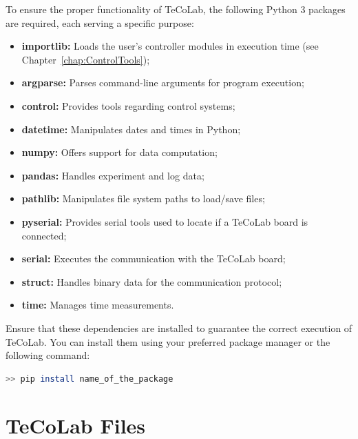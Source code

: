 \documentclass[12pt]{report}
\begin{document}
To ensure the proper functionality of TeCoLab, the following Python 3 packages are required, each serving a specific purpose:

\begin{itemize}
\item \textbf{importlib:} Loads the user's controller modules in execution time (see Chapter~\ref{chap:ControlTools});
\item \textbf{argparse:} Parses command-line arguments for program execution;

\item \textbf{control:} Provides tools regarding control systems;

\item \textbf{datetime:} Manipulates dates and times in Python;

\item \textbf{numpy:} Offers support for data computation;

\item \textbf{pandas:} Handles experiment and log data;

\item \textbf{pathlib:} Manipulates file system paths to load/save files;

\item \textbf{pyserial:} Provides serial tools used to locate if a TeCoLab board is connected;

\item \textbf{serial:} Executes the communication with the TeCoLab board;

\item \textbf{struct:} Handles binary data for the communication protocol;

\item \textbf{time:} Manages time measurements.

\end{itemize}

Ensure that these dependencies are installed to guarantee the correct execution of TeCoLab. You can install them using your preferred package manager or the following command:

\begin{lstlisting}[language=bash]
>> pip install name_of_the_package
\end{lstlisting}

\chapter{TeCoLab Files}\label{chap:files}
\end{document}
